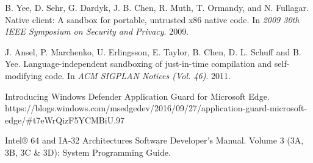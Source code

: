\documentclass{article}
\begin{document}
\begin{thebibliography}{99}
B. Yee, D. Sehr, G. Dardyk, J. B. Chen, R. Muth, T. Ormandy, and N. Fullagar.
Native client: A sandbox for portable, untrusted x86 native code.
In \emph{2009 30th IEEE Symposium on Security and Privacy}. 2009.

J. Ansel, P. Marchenko, U. Erlingsson, E. Taylor, B. Chen, D. L. Schuff and B. Yee.
Language-independent sandboxing of just-in-time compilation and self-modifying code.
In \emph{ACM SIGPLAN Notices (Vol. 46)}. 2011.

Introducing Windows Defender Application Guard for Microsoft Edge.
https://blogs.windows.com/msedgedev/2016/09/27/application-guard-microsoft-edge/\#t7eWrQizF5YCMBiU.97

Intel® 64 and IA-32 Architectures Software Developer’s Manual.
Volume 3 (3A, 3B, 3C \& 3D): System Programming Guide.

\end{thebibliography}
\end{document}
